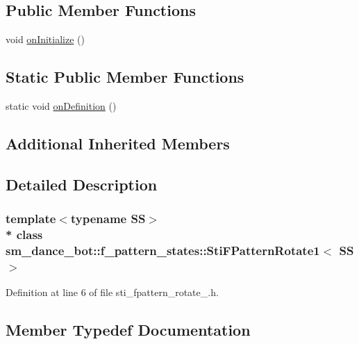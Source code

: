 \subsection*{Public Member Functions}
\begin{DoxyCompactItemize}
\item 
void \hyperlink{structsm__dance__bot_1_1f__pattern__states_1_1StiFPatternRotate1_af5f21d3f213c11ce128e9718597d8487}{on\+Initialize} ()
\end{DoxyCompactItemize}
\subsection*{Static Public Member Functions}
\begin{DoxyCompactItemize}
\item 
static void \hyperlink{structsm__dance__bot_1_1f__pattern__states_1_1StiFPatternRotate1_a05f6617abb908dd92e3628c86686ada4}{on\+Definition} ()
\end{DoxyCompactItemize}
\subsection*{Additional Inherited Members}


\subsection{Detailed Description}
\subsubsection*{template$<$typename SS$>$\\*
class sm\+\_\+dance\+\_\+bot\+::f\+\_\+pattern\+\_\+states\+::\+Sti\+F\+Pattern\+Rotate1$<$ S\+S $>$}



Definition at line 6 of file sti\+\_\+fpattern\+\_\+rotate\+\_.\+h.



\subsection{Member Typedef Documentation}
